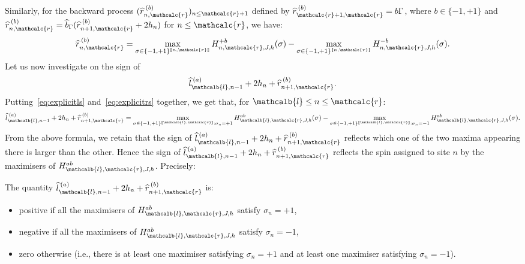 \documentclass[AHL,Unicode,longabstracts,published]{cedram}
\newcommand{\gG}{\Gamma}
\newcommand{\ls}{\widehat{l}}
\newcommand{\rs}{\widehat{r}}
\renewcommand{\ell}{\mathcalb{l}}
\newcommand{\err}{\mathcalc{r}}
\newcommand{\llbracket}{\mathopen{[\mkern -2.7mu[}}
\newcommand{\rrbracket}{\mathclose{]\mkern -2.7mu]}}
\newcommand{\lbra}{\llbracket}
\newcommand{\rbra}{\rrbracket}
\begin{document}
Similarly, for the backward process $(\rs^{\:(b)}_{n, \err})_{n\le \err+1}$ defined by $\rs^{\:(b)}_{\err+1, \err}= b \gG$, where $b\in\{-1,+1\}$ and $\rs_{n,\err}^{\:(b)}= \widehat{b}_\gG(\rs_{n+1, \err}^{\:(b)} + 2 h_n)$ for $n\le \err$, we have:
\begin{equation}\label{eq:explicitrs}
\rs^{\:(b)}_{n, \err} = \max_{\sigma\in\{-1, +1\}^{\lbra n, \err\rbra}} H_{ n,\err, J, h}^{+b}(\sigma) - \max_{\sigma\in\{-1, +1\}^{\lbra n, \err\rbra}} H_{ n, \err, J, h}^{-b}(\sigma).
\end{equation}
Let us now investigate on the sign of
\[
\ls_{\ell, n-1}^{\:(a)}+2 h_n + \rs_{n+1, \err}^{\:(b)}.
\] 
Putting~\eqref{eq:explicitls} and~\eqref{eq:explicitrs} together, we get that, for $\ell \le n \le \err$:
\[
\ls_{\ell, n-1}^{\:(a)}+2 h_n + \rs_{n+1, \err}^{\:(b)}= \max_{\sigma\in\{-1, +1\}^{\lbra\ell,\err\rbra}: \sigma_n=+1} H_{\ell, \err, J, h}^{ab}(\sigma) - \max_{\sigma\in\{-1, +1\}^{\lbra\ell, \err\rbra}: \sigma_n=-1} H_{\ell, \err, J, h}^{ab}(\sigma).
\]
From the above formula, we retain that the sign of $\ls_{\ell, n-1}^{\:(a)}+2 h_n + \rs_{n+1, \err}^{\:(b)}$ reflects which one of the two maxima appearing there is larger than the other. Hence the sign of $\ls_{\ell, n-1}^{\:(a)}+2 h_n + \rs_{n+1, \err}^{\:(b)}$ reflects the spin assigned to site $n$ by the maximisers of $H_{\ell, \err, J, h}^{ab}$. Precisely:

\begin{lemm}\label{lem:maximiserssign}
The quantity $ \ls_{\ell, n-1}^{\:(a)}+2 h_n + \rs_{n+1, \err}^{\: (b)}$ is:
\begin{itemize}
\item positive if all the maximisers of $H_{\ell, \err, J, h}^{ab}$ satisfy $\sigma_n=+1$,
\item negative if all the maximisers of $H_{\ell, \err, J, h}^{ab}$ satisfy $\sigma_n=-1$,
\item zero otherwise (i.e., there is at least one maximiser satisfying $\sigma_n=+1$ and at least one maximiser satisfying $\sigma_n=-1$).
\end{itemize}
\end{lemm}
\end{document}
